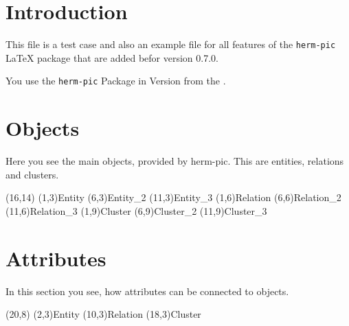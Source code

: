 \documentclass[a4paper,11pt]{article}
\begin{document}
\section{Introduction}

This file is a test case and also an example file for all features of
the {\tt herm-pic} LaTeX package that are added befor version 0.7.0.

You use the {\tt herm-pic} Package in Version \HPlongrevision{} from the \HPdate.

\section{Objects}

Here you see the main objects, provided by herm-pic. This are entities, relations
and clusters.

\setlength{\unitlength}{.6cm}
\begin{schema}(16,14)
  \entity(1,3){Entity}
  \entity*(6,3){Entity\_2}
  \entity[entity3](11,3){Entity\_3}
  \relation(1,6){Relation}
  \relation*(6,6){Relation\_2}
  \relation[relation3](11,6){Relation\_3}
  \cluster(1,9){Cluster}
  \cluster*(6,9){Cluster\_2}
  \cluster[cluster3](11,9){Cluster\_3}
\end{schema}

\section{Attributes}

In this section you see, how attributes can be connected to objects.

\begin{schema}(20,8)
  \entity[entity](2,3){Entity}
  \relation[relation](10,3){Relation}
  \cluster[cluster](18,3){Cluster}
\end{schema}
\end{document}
